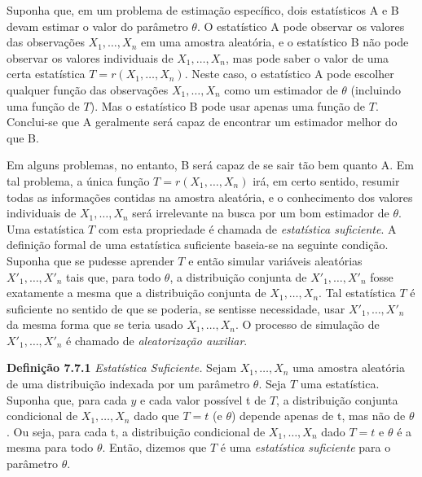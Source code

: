 Suponha que, em um problema de estimação específico, dois estatísticos A e B devam estimar o valor do parâmetro $\theta$. O estatístico A pode observar os valores das observações $X_1, \dots, X_n$ em uma amostra aleatória, e o estatístico B não pode observar os valores individuais de $X_1, \dots, X_n$, mas pode saber o valor de uma certa estatística $T = r(X_1, \dots, X_n)$. Neste caso, o estatístico A pode escolher qualquer função das observações $X_1, \dots, X_n$ como um estimador de $\theta$ (incluindo uma função de $T$). Mas o estatístico B pode usar apenas uma função de $T$. Conclui-se que A geralmente será capaz de encontrar um estimador melhor do que B.

Em alguns problemas, no entanto, B será capaz de se sair tão bem quanto A. Em tal problema, a única função $T=r(X_1, \dots, X_n)$ irá, em certo sentido, resumir todas as informações contidas na amostra aleatória, e o conhecimento dos valores individuais de $X_1, \dots, X_n$ será irrelevante na busca por um bom estimador de $\theta$. Uma estatística $T$ com esta propriedade é chamada de \textit{estatística suficiente}. A definição formal de uma estatística suficiente baseia-se na seguinte condição. Suponha que se pudesse aprender $T$ e então simular variáveis aleatórias $X'_1, \dots, X'_n$ tais que, para todo $\theta$, a distribuição conjunta de $X'_1, \dots, X'_n$ fosse exatamente a mesma que a distribuição conjunta de $X_1, \dots, X_n$. Tal estatística $T$ é suficiente no sentido de que se poderia, se sentisse necessidade, usar $X'_1, \dots, X'_n$ da mesma forma que se teria usado $X_1, \dots, X_n$. O processo de simulação de $X'_1, \dots, X'_n$ é chamado de \textit{aleatorização auxiliar}.

\noindent\textbf{Definição 7.7.1} \textit{Estatística Suficiente.} Sejam $X_1, \dots, X_n$ uma amostra aleatória de uma distribuição indexada por um parâmetro $\theta$. Seja $T$ uma estatística. Suponha que, para cada $y$ e cada valor possível t de $T$, a distribuição conjunta condicional de $X_1, \dots, X_n$ dado que $T=t$ (e $\theta$) depende apenas de t, mas não de $\theta$. Ou seja, para cada t, a distribuição condicional de $X_1, \dots, X_n$ dado $T=t$ e $\theta$ é a mesma para todo $\theta$. Então, dizemos que $T$ é uma \textit{estatística suficiente} para o parâmetro $\theta$.

\vspace{\baselineskip}


